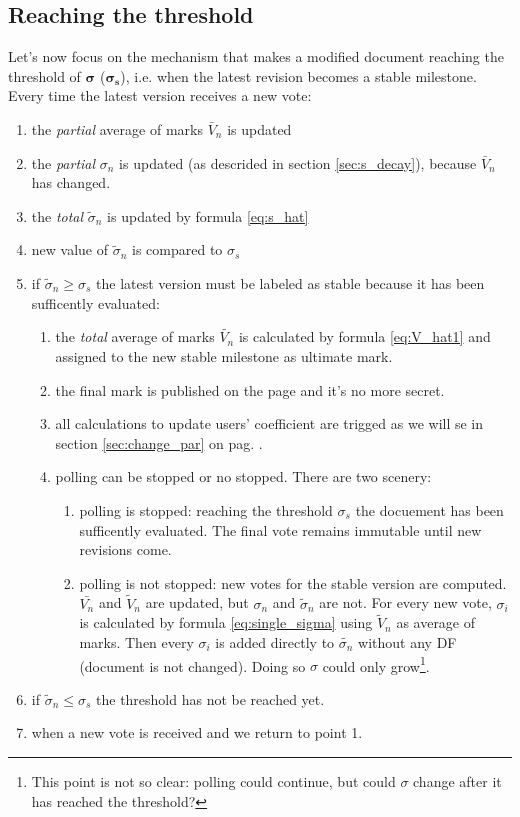 \documentclass[a4paper,11pt]{article}
\begin{document}
\subsection{Reaching the threshold} \label{sec:reaching_thre}
Let's now focus on the mechanism that makes a modified document reaching the threshold of $\boldsymbol{\sigma}$ ($\boldsymbol{\sigma_s}$), i.e. when the latest revision becomes a stable milestone. \\Every time the latest version receives a new vote:
\begin{enumerate}
\item the \emph{partial} average of marks $\bar{V}_n$ is updated
\item the \emph{partial} $\sigma_n$ is updated (as descrided in section \ref{sec:s_decay}), because $\bar{V}_n$ has changed.
\item the \emph{total} $\tilde{\sigma}_n$ is updated by formula \ref{eq:s_hat}
\item new value of $\tilde{\sigma}_n$ is compared to  $\sigma_s$
\item if $\tilde{\sigma}_n \geq \sigma_s$  the latest version must be labeled as stable because it has been sufficently evaluated:
\begin{enumerate}
\item the \emph{total} average of marks $\tilde{V_n}$ is calculated by formula \ref{eq:V_hat1} and assigned to the new stable milestone as ultimate mark.
\item the final mark is published on the page and it's no more secret.
\item all calculations to update users' coefficient are trigged as we will se in section \ref{sec:change_par} on pag. \pageref{sec:change_par}.
\item polling can be stopped or no stopped. There are two scenery:
\begin{enumerate}
\item polling is stopped: reaching the threshold $\sigma_s$ the docuement has been sufficently evaluated. The final vote remains immutable until new revisions come.
\item polling is not stopped: new votes for the stable version are computed.  $\bar{V_n}$ and  $\tilde{V}_n$ are updated, but $\sigma_n$ and $\tilde{\sigma}_n$ are not. For every new vote, $\sigma_i$ is calculated by formula \ref{eq:single_sigma} using $\tilde{V}_n$ as average of marks. Then every $\sigma_i$ is added directly to $\tilde{\sigma_n}$ without any DF (document is not changed). Doing so $\sigma$ could only grow\footnote{This point is not so clear: polling could continue, but could $\sigma$  change after it has reached the threshold?}.
\end{enumerate} 
\end{enumerate}
\item if $\tilde{\sigma}_n \leq \sigma_s$ the threshold has not be reached yet.
\item when a new vote is received and we return to point 1.
\end{enumerate}
\end{document}

